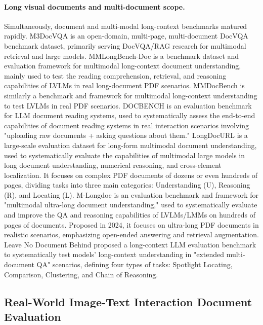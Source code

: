 \paragraph{Long visual documents and multi-document scope.}
Simultaneously, document and multi-modal long-context benchmarks matured rapidly. M3DocVQA \cite{m3docvqa2024} is an open-domain, multi-page, multi-document DocVQA benchmark dataset, primarily serving DocVQA/RAG research for multimodal retrieval and large models. MMLongBench-Doc \cite{mmlongbenchdoc2024} is a benchmark dataset and evaluation framework for multimodal long-context document understanding, mainly used to test the reading comprehension, retrieval, and reasoning capabilities of LVLMs in real long-document PDF scenarios. MMDocBench \cite{mmdocbench2024} is similarly a benchmark and framework for multimodal long-context understanding to test LVLMs in real PDF scenarios. DOCBENCH \cite{docbench2024} is an evaluation benchmark for LLM document reading systems, used to systematically assess the end-to-end capabilities of document reading systems in real interaction scenarios involving "uploading raw documents + asking questions about them." LongDocURL \cite{longdocurl2024} is a large-scale evaluation dataset for long-form multimodal document understanding, used to systematically evaluate the capabilities of multimodal large models in long document understanding, numerical reasoning, and cross-element localization. It focuses on complex PDF documents of dozens or even hundreds of pages, dividing tasks into three main categories: Understanding (U), Reasoning (R), and Locating (L). M-Longdoc \cite{mlongdoc2024} is an evaluation benchmark and framework for "multimodal ultra-long document understanding," used to systematically evaluate and improve the QA and reasoning capabilities of LVLMs/LMMs on hundreds of pages of documents. Proposed in 2024, it focuses on ultra-long PDF documents in realistic scenarios, emphasizing open-ended answering and retrieval augmentation. Leave No Document Behind \cite{leavenodocumentbehind2024} proposed a long-context LLM evaluation benchmark to systematically test models' long-context understanding in "extended multi-document QA" scenarios, defining four types of tasks: Spotlight Locating, Comparison, Clustering, and Chain of Reasoning.

\subsection{Real-World Image-Text Interaction Document Evaluation}

